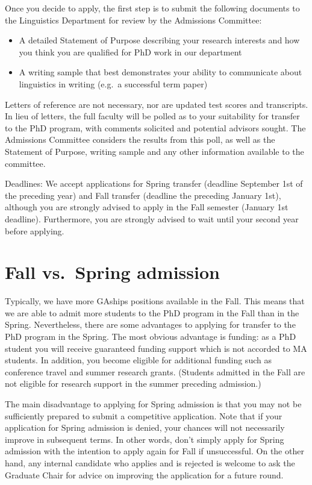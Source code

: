 \documentclass[
]{book}
\providecommand{\tightlist}{%
  \setlength{\itemsep}{0pt}\setlength{\parskip}{0pt}}
\begin{document}
Once you decide to apply, the first step is to submit the following documents to the Linguistics Department for review by the Admissions Committee:

\begin{itemize}
\tightlist
\item
  A detailed Statement of Purpose describing your research interests and how you think you are qualified for PhD work in our department
\item
  A writing sample that best demonstrates your ability to communicate about linguistics in writing (e.g.~a successful term paper)
\end{itemize}

Letters of reference are not necessary, nor are updated test scores and transcripts. In lieu of letters, the full faculty will be polled as to your suitability for transfer to the PhD program, with comments solicited and potential advisors sought. The Admissions Committee considers the results from this poll, as well as the Statement of Purpose, writing sample and any other information available to the committee.

Deadlines: We accept applications for Spring transfer (deadline September 1st of the preceding year) and Fall transfer (deadline the preceding January 1st), although you are strongly advised to apply in the Fall semester (January 1st deadline). Furthermore, you are strongly advised to wait until your second year before applying.

\section{Fall vs.~Spring admission}\label{fall-vs.-spring-admission}

Typically, we have more GAships positions available in the Fall. This means that we are able to admit more students to the PhD program in the Fall than in the Spring. Nevertheless, there are some advantages to applying for transfer to the PhD program in the Spring. The most obvious advantage is funding: as a PhD student you will receive guaranteed funding support which is not accorded to MA students. In addition, you become eligible for additional funding such as conference travel and summer research grants. (Students admitted in the Fall are not eligible for research support in the summer preceding admission.)

The main disadvantage to applying for Spring admission is that you may not be sufficiently prepared to submit a competitive application. Note that if your application for Spring admission is denied, your chances will not necessarily improve in subsequent terms. In other words, don't simply apply for Spring admission with the intention to apply again for Fall if unsuccessful. On the other hand, any internal candidate who applies and is rejected is welcome to ask the Graduate Chair for advice on improving the application for a future round.
\end{document}

